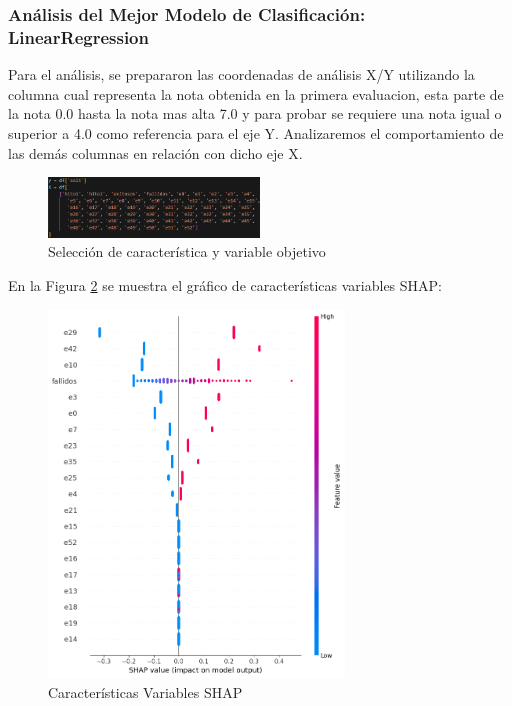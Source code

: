 \subsubsection{Análisis del Mejor Modelo de Clasificación: LinearRegression}

Para el análisis, se prepararon las coordenadas de análisis X/Y utilizando la columna  cual representa la nota obtenida en la primera evaluacion, esta parte de la nota 0.0 hasta la nota mas alta 7.0 y para probar se requiere una nota igual o superior a 4.0 como referencia para el eje Y. Analizaremos el comportamiento de las demás columnas en relación con dicho eje X.

\begin{figure}[H]
    \centering
    \includegraphics[width=0.5\textwidth]{img/shap_lr/dependencia_variable_objetivo.png}
    \caption{Selección de característica y variable objetivo}
    \label{fig:variables_entrenamiento_lr}
\end{figure}

En la Figura \ref{fig:caract_var_shap_lr1} se muestra el gráfico de características variables SHAP:

\begin{figure}[H]
    \centering
    \includegraphics[width=0.7\textwidth]{img/shap_lr/shapForcePlot_lr.png}
    \caption{Características Variables SHAP}
    \label{fig:caract_var_shap_lr1}
\end{figure}

